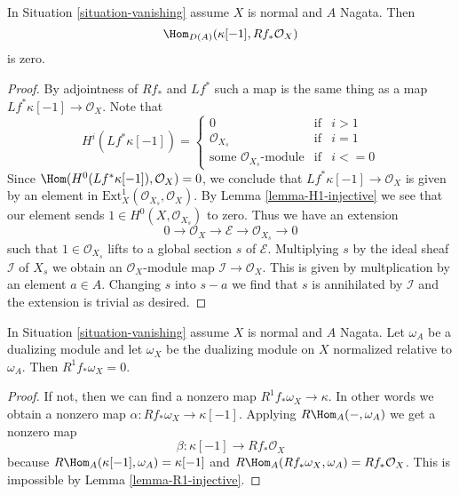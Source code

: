 \begin{lemma}
\label{lemma-R1-injective}
In Situation \ref{situation-vanishing} assume $X$ is normal and $A$ Nagata.
Then
$$
\Hom_{D(A)}(\kappa[-1], Rf_*\mathcal{O}_X)
$$
is zero.
\end{lemma}

\begin{proof}
By adjointness of $Rf_*$ and $Lf^*$ such a map is the same thing
as a map $Lf^*\kappa[-1] \to \mathcal{O}_X$. Note that
$$
H^i(Lf^*\kappa[-1]) =
\left\{
\begin{matrix}
0 & \text{if} & i > 1 \\
\mathcal{O}_{X_s} & \text{if} & i = 1 \\
\text{some }\mathcal{O}_{X_s}\text{-module} & \text{if} & i <= 0
\end{matrix}
\right.
$$
Since $\Hom(H^0(Lf^*\kappa[-1]), \mathcal{O}_X) = 0$, we conclude that
$Lf^*\kappa[-1] \to \mathcal{O}_X$ is given by an element in
$\text{Ext}^1_X(\mathcal{O}_{X_s}, \mathcal{O}_X)$. By Lemma
\ref{lemma-H1-injective} we see that our element sends
$1 \in H^0(X, \mathcal{O}_{X_s})$ to zero. Thus we have an extension
$$
0 \to \mathcal{O}_X \to \mathcal{E} \to \mathcal{O}_{X_s} \to 0
$$
such that $1 \in \mathcal{O}_{X_s}$ lifts to a global section $s$ of
$\mathcal{E}$. Multiplying $s$ by the ideal sheaf $\mathcal{I}$
of $X_s$ we obtain an $\mathcal{O}_X$-module map
$\mathcal{I} \to \mathcal{O}_X$. This is given by multplication
by an element $a \in A$. Changing $s$ into $s -  a$ we find that
$s$ is annihilated by $\mathcal{I}$ and the extension is trivial
as desired.
\end{proof}


\begin{proposition}
\label{proposition-Grauert-Riemenschneider}
In Situation \ref{situation-vanishing} assume $X$ is normal and $A$ Nagata.
Let $\omega_A$ be a dualizing module and let $\omega_X$ be the dualizing
module on $X$ normalized relative to $\omega_A$.
Then $R^1f_*\omega_X = 0$.
\end{proposition}

\begin{proof}
If not, then we can find a nonzero map $R^1f_*\omega_X \to \kappa$.
In other words we obtain a nonzero map $\alpha : Rf_*\omega_X \to \kappa[-1]$.
Applying $R\Hom_A(-, \omega_A)$
we get a nonzero map
$$
\beta : \kappa[-1] \longrightarrow Rf_*\mathcal{O}_X
$$
because $R\Hom_A(\kappa[-1], \omega_A) = \kappa[-1]$
and $R\Hom_A(Rf_*\omega_X, \omega_A) = Rf_*\mathcal{O}_X$.
This is impossible by Lemma \ref{lemma-R1-injective}.
\end{proof}










